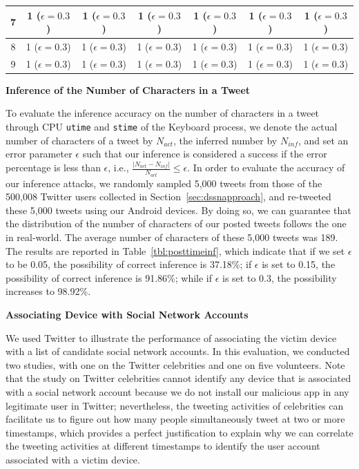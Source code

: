 \documentclass[letterpaper,12pt]{article}
\begin{document}
\begin{table}
{\begin{tabular}{|c|c|c|c|c|c|c|}
\hline
7                                 & 1 ($\epsilon=0.3$)      & 1 ($\epsilon=0.3$)      & 1 ($\epsilon=0.3$)      & 1 ($\epsilon=0.3$)      & 1 ($\epsilon=0.3$)      & 1 ($\epsilon=0.3$)       \\ 
\hline
8                                 & 1 ($\epsilon=0.3$)      & 1 ($\epsilon=0.3$)      & 1 ($\epsilon=0.3$)      & 1 ($\epsilon=0.3$)      & 1 ($\epsilon=0.3$)      & 1 ($\epsilon=0.3$)       \\ 
\hline
9                                 & 1 ($\epsilon=0.3$)      & 1 ($\epsilon=0.3$)      & 1 ($\epsilon=0.3$)      & 1 ($\epsilon=0.3$)      & 1 ($\epsilon=0.3$)      & 1 ($\epsilon=0.3$)       \\
\hline
\end{tabular}
}
\end{table}

\textbf{Inference of the Number of Characters in a Tweet}

To evaluate the inference accuracy on the number of characters in a tweet through CPU \texttt{utime} and \texttt{stime} of the Keyboard process, we denote the actual number of characters of a tweet by $N_{act}$, the inferred number by $N_{inf}$, and set an error parameter $\epsilon$ such that our inference is considered a success if the error percentage is less than $\epsilon$, i.e., $\frac{|N_{act}-N_{inf}|}{N_{act}}\le\epsilon$. 
In order to evaluate the accuracy of our inference attacks, we randomly sampled 5,000 tweets from those of the 500,008 Twitter users collected in Section~\ref{sec:dssnapproach}, and re-tweeted these 5,000 tweets using our Android devices. By doing so, we can guarantee that the distribution of the number of characters of our posted tweets follows the one in real-world.
The average number of characters of these 5,000 tweets was 189. The results are reported in Table~\ref{tbl:posttimeinf}, which indicate that if we set $\epsilon$ to be 0.05, the possibility of correct inference is 37.18\%; if $\epsilon$ is set to 0.15, the possibility of correct inference is 91.86\%; while if $\epsilon$ is set to 0.3, the possibility increases to 98.92\%. %

\textbf{Associating Device with Social Network Accounts}

We used Twitter to illustrate the performance of associating the victim device with a list of candidate social network accounts. In this evaluation, we conducted two studies, with one on the Twitter celebrities and one on five volunteers. Note that the study on Twitter celebrities cannot identify any device that is associated with a social network account because we do not install our malicious app in any legitimate user in Twitter; nevertheless, the tweeting activities of celebrities can facilitate us to figure out how many people simultaneously tweet at two or more timestamps, which provides a perfect justification to explain why we can correlate the tweeting activities at different timestamps to identify the user account associated with a victim device.
\end{document}
